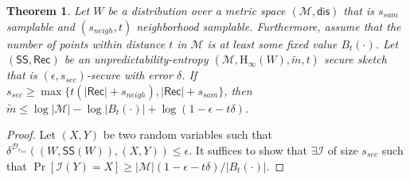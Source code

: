 \documentclass[11pt]{article}
\newcommand{\class}[1]{{\ensuremath{\mathsf{#1}}}}
\newcommand{\sketch}{\ensuremath{\class{SS}}\xspace}
\newcommand{\rec}{\ensuremath{\class{Rec}}\xspace}
\newcommand{\dis}{\ensuremath{\mathsf{dis}}}
\newcommand{\Hoo}{\mathrm{H}_\infty}
\newtheorem{theorem}{Theorem}[section]
\begin{document}
\begin{theorem}
Let $W$ be a distribution over a metric space $(\mathcal{M}, \dis)$ that is $s_{sam}$ samplable and $(s_{neigh}, t)$ neighborhood samplable.  Furthermore, assume that the number of points within distance $t$ in $\mathcal{M}$ is at least some fixed value $B_t(\cdot)$.  Let $(\sketch, \rec)$ be an unpredictability-entropy $(\mathcal{M}, \Hoo(W), \tilde{m}, t)$ secure sketch that is $(\epsilon, s_{sec})$-secure with error $\delta$.  If $s_{sec} \geq \max\{ t(|\rec| +s_{neigh}), |\rec| + s_{sam}\}$, then $\tilde{m}\leq \log |\mathcal{M}| - \log |B_t(\cdot)| + \log(1-\epsilon -t\delta)$.
\end{theorem}
\begin{proof}
Let $(X, Y)$ be two random variables such that $\delta^{\mathcal{D}_{s_{sec}}}((W, \sketch(W)), (X, Y))\leq \epsilon$.  It suffices to show that $\exists \mathcal{I}$ of size $s_{sec}$ such that $\Pr[\mathcal{I}(Y) = X]\geq |\mathcal{M}| (1-\epsilon -t\delta) / |B_t(\cdot)|$.  


\end{proof}
\end{document}
